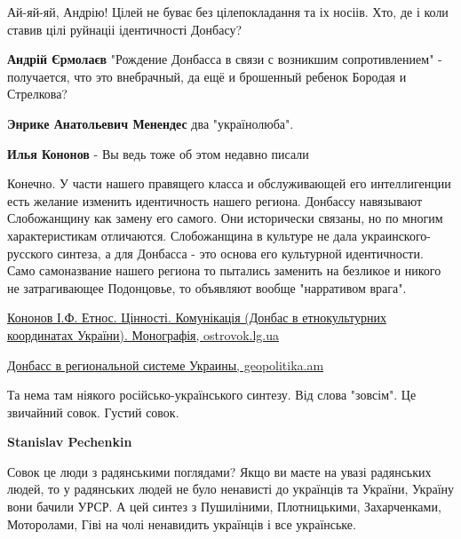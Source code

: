 \begin{itemize}
\begin{itemize}

Ай-яй-яй, Андрію! Цілей не буває без цілепокладання та іх носіів. Хто, де і коли
ставив цілі руйнаціі ідентичності Донбасу?

\textbf{Андрій Єрмолаєв} "Рождение Донбасса в связи с возникшим сопротивлением" - получается, что это внебрачный, да ещё и брошенный ребенок Бородая и Стрелкова?

\textbf{Энрике Анатольевич Менендес} два "українолюба".

\end{itemize} %

\textbf{Илья Кононов} - Вы ведь тоже об этом недавно писали

\begin{itemize} %

Конечно. У части нашего правящего класса и обслуживающей его интеллигенции есть
желание изменить идентичность нашего региона. Донбассу навязывают Слобожанщину
как замену его самого. Они исторически связаны, но по многим характеристикам
отличаются. Слобожанщина в культуре не дала украинского-русского синтеза, а для
Донбасса - это основа его культурной идентичности. Само самоназвание нашего
региона то пытались заменить на безликое и никого не затрагивающее Подонцовье,
то объявляют вообще "нарративом врага".


\href{http://www.ostrovok.lg.ua/knigohranilishhe/nauka/kononov-if-etnos-cinnosti-komunikaciya-donbas-v-etnokulturnih-koordinatah-ukrayini-monografiya}{%
Кононов І.Ф. Етнос. Цінності. Комунікація (Донбас в етнокультурних координатах України). Монографія, %
ostrovok.lg.ua%
}


\href{http://geopolitika.am/dir/wp-content/blogs.dir/1/files/2021_3_21_33.pdf}{%
Донбасс в региональной системе Украины, geopolitika.am%
}


Та нема там ніякого російсько-українського синтезу. Від слова "зовсім". Це
звичайний совок. Густий совок.

\textbf{Stanislav Pechenkin} 

Совок це люди з радянськими поглядами? Якщо ви маєте на увазі радянських людей,
то у радянських людей не було ненависті до українців та України, Україну вони
бачили УРСР. А цей синтез з Пушиліними, Плотницькими, Захарченками, Моторолами,
Гіві на чолі ненавидить українців і все українське.



\end{itemize}
\end{itemize}
